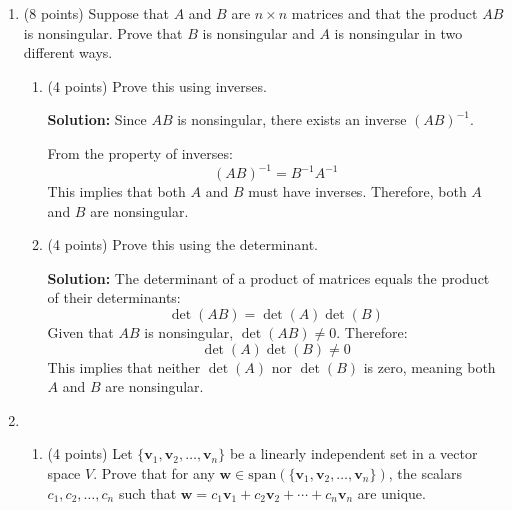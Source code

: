 \documentclass[12pt]{article}
\newcommand{\qspace}{\vspace{1em}} %
\newenvironment{solution}{\noindent\textbf{Solution:} }{\qspace}
\begin{document}
\begin{enumerate}
\begin{solution}
    - Rank of \( AB \) is at most Rank of \( A \):
      The columns of \( AB \) are linear combinations of the columns of \( A \). Therefore, the column space of \( AB \) is a subspace of the column space of \( A \), implying \( \text{rank}(AB) \leq \text{rank}(A) \).

    - Rank of \( AB \) is at most Rank of \( B \):
      Similarly, the rows of \( AB \) are linear combinations of the rows of \( B \). Hence, the row space of \( AB \) is a subspace of the row space of \( B \), implying \( \text{rank}(AB) \leq \text{rank}(B) \).

    Combining both, we get:
    \[
    \text{rank}(AB) \leq \min(\text{rank}(A), \text{rank}(B))
    \]
    \end{solution}
    
    \item (8 points) 
    Suppose that \( A \) and \( B \) are \( n \times n \) matrices and that the product \( AB \) is nonsingular. Prove that \( B \) is nonsingular and \( A \) is nonsingular in two different ways.
    \begin{enumerate}
        \item (4 points) Prove this using inverses.
        
        \begin{solution}
        Since \( AB \) is nonsingular, there exists an inverse \( (AB)^{-1} \).

        From the property of inverses:
        \[
        (AB)^{-1} = B^{-1} A^{-1}
        \]
        This implies that both \( A \) and \( B \) must have inverses. Therefore, both \( A \) and \( B \) are nonsingular.
        \end{solution}
        
        \item (4 points) Prove this using the determinant.
        
        \begin{solution}
        The determinant of a product of matrices equals the product of their determinants:
        \[
        \det(AB) = \det(A) \det(B)
        \]
        Given that \( AB \) is nonsingular, \( \det(AB) \neq 0 \). Therefore:
        \[
        \det(A) \det(B) \neq 0
        \]
        This implies that neither \( \det(A) \) nor \( \det(B) \) is zero, meaning both \( A \) and \( B \) are nonsingular.
        \end{solution}
    \end{enumerate}
    
    \item \begin{enumerate}
        \item (4 points) Let $\{\mathbf{v}_1, \mathbf{v}_2, \dots, \mathbf{v}_n\}$ be a linearly independent set in a vector space $V$. Prove that for any $\mathbf{w} \in \text{span}(\{\mathbf{v}_1, \mathbf{v}_2, \dots, \mathbf{v}_n\})$, the scalars $c_1, c_2, \dots, c_n$ such that $\mathbf{w} = c_1 \mathbf{v}_1 + c_2 \mathbf{v}_2 + \cdots + c_n \mathbf{v}_n$ are unique.
        

\end{enumerate}
\end{enumerate}
\end{document}
